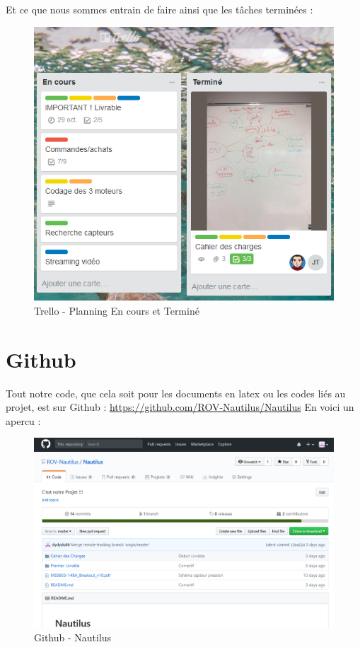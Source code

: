 \documentclass[a4paper,11pt]{report}
\begin{document}
						\newpage Et ce que nous sommes entrain de faire ainsi que les tâches terminées :
						\begin{figure}[!h]
							\begin{center}
								\includegraphics[scale=0.5]{Illustrations/Planning2.png}
								\caption{Trello - Planning En cours et Terminé}
							\end{center}
						\end{figure}
						
        \section{Github}
				Tout notre code, que cela soit pour les documents en latex ou les codes liés au projet, est sur Github :
				\url{https://github.com/ROV-Nautilus/Nautilus}
				\newline En voici un apercu :
					\begin{figure}[!h]
							\begin{center}
								\includegraphics[scale=0.4]{Illustrations/Github.png}
								\caption{Github - Nautilus}
							\end{center}
						\end{figure}
				
\end{document}

